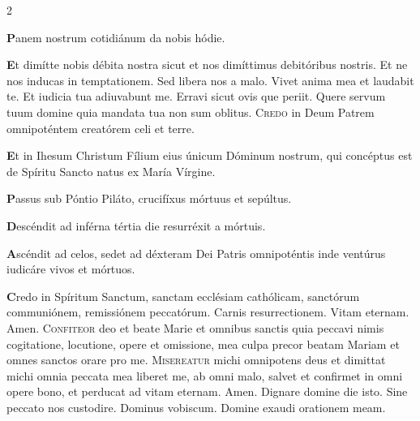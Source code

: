 \begin{multicols}{2}
\par {\bfseries \color{Blue} P}anem nostrum cotidiánum da nobis hódie.
\par {\bfseries \color{Red} E}t dimítte nobis débita nostra sicut et nos dimíttimus debitóribus nostris.
\aftergroup\clearparshape%
\endgroup
\newline {} Et ne nos inducas in temptationem. \R Sed libera nos a malo.
\newline \V Vivet anima mea et laudabit te. \R Et iudicia tua adiuvabunt me.
\newline \V Erravi sicut ovis que periit. \R Quere servum tuum domine quia mandata tua non sum oblitus.
\newline {}
\lettrine[lines=2]{\zallmancaps \color{Blue} C}{redo} in Deum Patrem omnipoténtem creatórem celi et terre.
\begingroup
\setlength{\parindent}{.25em}
\par {\bfseries \color{Red} E}t in Ihesum Christum Fílium eius únicum Dóminum nostrum, qui concéptus est de Spíritu Sancto natus ex María Vírgine.
\par {\bfseries \color{Blue} P}assus sub Póntio Piláto, crucifíxus mórtuus et sepúltus.
\par {\bfseries \color{Red} D}escéndit ad inférna tértia die resurréxit a mórtuis.
\par {\bfseries \color{Blue} A}scéndit ad celos, sedet ad déxteram Dei Patris omnipoténtis inde ventúrus iudicáre vivos et mórtuos.
\par {\bfseries \color{Red} C}redo in Spíritum Sanctum, sanctam ecclésiam cathólicam, sanctórum communiónem, remissiónem peccatórum.
\aftergroup\clearparshape%
\endgroup
\newline {} Carnis resurrectionem. \R Vitam eternam. Amen. 
\lettrine[lines=2]{\zallmancaps \color{Red} C}{onfiteor} deo et beate Marie et omnibus sanctis quia peccavi nimis cogitatione, locutione, opere et omissione, mea culpa precor beatam Mariam et omnes sanctos orare pro me.
\newline {}
\lettrine[lines=2]{\zallmancaps \color{Blue} M}{isereatur} michi omnipotens deus et dimittat michi omnia peccata mea liberet me, ab omni malo, salvet et confirmet in omni opere bono, et perducat ad vitam eternam. \R Amen.
\newline \V Dignare domine die isto. \R Sine peccato nos custodire.
\newline Dominus vobiscum.  Domine exaudi orationem meam.

\end{multicols}
